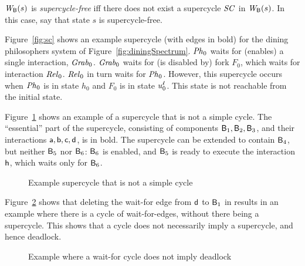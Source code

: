 \begin{definition}
\label{def:supercycle-free}
\label{defn:supercycle-free}
$\mathit{W}_{\mathsf{B}}({s})$ is \emph{supercycle-free} iff 
there does not exist a supercycle $\mathit{SC}$ in $\mathit{W}_{\mathsf{B}}({s})$. 
In this case, say that state $s$ is supercycle-free.
\end{definition}

\begin{figure*}[ht]
  \begin{center}
   \scalebox{0.4}{}
   \caption{Example supercycle for dining philosophers system of Figure~\ref{fig:diningSpectrum}.}
   \label{fig:sc}
  \end{center}
\end{figure*}


Figure~\ref{fig:sc} shows an example supercycle (with edges in bold) for the dining philosophers
system of Figure~\ref{fig:diningSpectrum}.
$\mathit{Ph}_0$ waits for (enables) a single interaction, $\mathit{Grab}_0$. 
$\mathit{Grab}_0$ waits for (is disabled by) fork $F_0$, which waits for interaction $\mathit{Rel}_0$.
$\mathit{Rel}_0$ in turn waits for $\mathit{Ph}_0$. However, this supercycle occurs when $\mathit{Ph}_0$ is in state $h_0$
and $F_0$ is in state $u_0^\ell$. This state is not reachable from the initial state. 


Figure~\ref{fig:SCnotCycle} shows an example of a supercycle that is not a simple cycle.  The ``essential'' part of the supercycle, consisting of
components $\mathsf{B}_1, \mathsf{B}_2, \mathsf{B}_3$, and their interactions $\mathsf{a}, \mathsf{b}, \mathsf{c}, \mathsf{d}$, is in bold.  
The supercycle can be extended to contain $\mathsf{B}_4$, but neither $\mathsf{B}_5$ nor
$\mathsf{B}_6$: $\mathsf{B}_6$ is enabled, and $\mathsf{B}_5$ is ready to execute the interaction $\mathsf{h}$, which waits only for $\mathsf{B}_6$.
%
\begin{figure}[ht]
\begin{center}
\scalebox{0.6}{}
\caption{Example supercycle that is not a simple cycle}
\label{fig:SCnotCycle}
\end{center}
\end{figure}
%
Figure~\ref{fig:cycleOK} shows that deleting the wait-for edge from $\mathsf{d}$ to $\mathsf{B}_1$ in  results in 
an example where there is
a cycle of wait-for-edges, without there being a supercycle. This shows
that a cycle does not necessarily imply a supercycle, and hence
deadlock. 
%
\begin{figure}[ht]
\begin{center}
\scalebox{0.6}{}
\caption{Example where a wait-for cycle does not imply deadlock}
\label{fig:cycleOK}
\end{center}
\end{figure}


